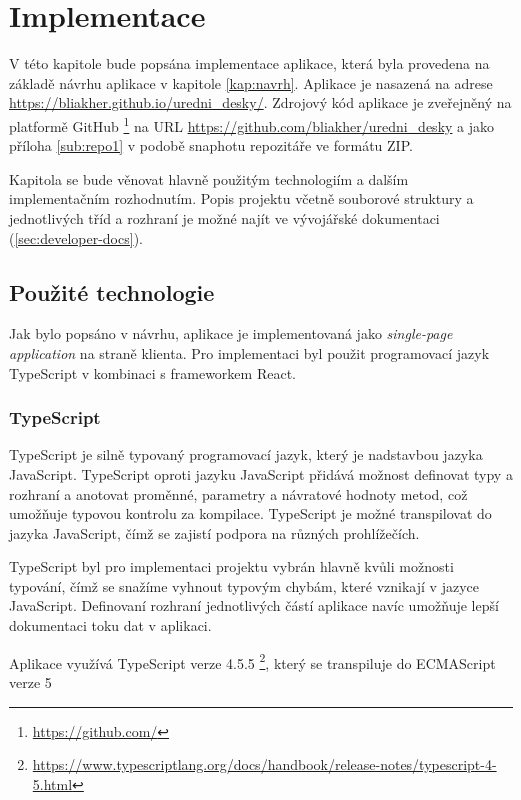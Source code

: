 
\chapter{Implementace}\label{kap:implementace}

V této kapitole bude popsána implementace aplikace, která byla provedena na základě návrhu aplikace v kapitole \ref{kap:navrh}. Aplikace je nasazená na adrese \url{https://bliakher.github.io/uredni_desky/}. Zdrojový kód aplikace je zveřejněný na platformě GitHub \footnote{\url{https://github.com/}} na URL \url{https://github.com/bliakher/uredni_desky} a jako příloha \ref{sub:repo1} v podobě snaphotu repozitáře ve formátu ZIP.

Kapitola se bude věnovat hlavně použitým technologiím a dalším implementačním rozhodnutím. Popis projektu včetně souborové struktury a jednotlivých tříd a rozhraní je možné najít ve vývojářské dokumentaci (\autoref{sec:developer-docs}).

\section{Použité technologie}

Jak bylo popsáno v návrhu, aplikace je implementovaná jako \textit{single-page application} na straně klienta. Pro implementaci byl použit programovací jazyk TypeScript v kombinaci s frameworkem React.

\subsection{TypeScript}

TypeScript \cite{TS} je silně typovaný programovací jazyk, který je nadstavbou jazyka JavaScript. TypeScript oproti jazyku JavaScript přidává možnost definovat typy a rozhraní a anotovat proměnné, parametry a návratové hodnoty metod, což umožňuje typovou kontrolu za kompilace. TypeScript je možné transpilovat do jazyka JavaScript, čímž se zajistí podpora na různých prohlížečích.

TypeScript byl pro implementaci projektu vybrán hlavně kvůli možnosti typování, čímž se snažíme vyhnout typovým chybám, které vznikají v jazyce JavaScript. Definovaní rozhraní jednotlivých částí aplikace navíc umožňuje lepší dokumentaci toku dat v aplikaci.

Aplikace využívá TypeScript verze 4.5.5 \footnote{\url{https://www.typescriptlang.org/docs/handbook/release-notes/typescript-4-5.html}}, který se transpiluje do ECMAScript verze 5 \cite{ecma5}

